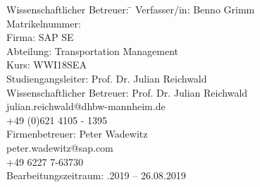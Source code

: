 \begin{titlepage}
\begin{center}
\begin{minipage}{\textwidth}
\begin{tabbing}
	Wissenschaftlicher Betreuer: \hspace{0.85cm}\=\kill
	Verfasser/in: \> Benno Grimm \\[1.5mm]
	Matrikelnummer:  \\[1.5mm]
	Firma: \> SAP SE  \\[1.5mm]
	Abteilung: \> Transportation Management \\[1.5mm]
	Kurs: \> WWI18SEA \\[1.5mm]
	Studiengangsleiter: \> Prof. Dr. Julian Reichwald  \\[1.5mm]
	Wissenschaftlicher Betreuer: \> Prof. Dr. Julian Reichwald \\
	\> julian.reichwald@dhbw-mannheim.de \\
	\> +49 (0)621 4105 - 1395 \\[1.5mm]
	Firmenbetreuer: \> Peter Wadewitz \\
	\> peter.wadewitz@sap.com \\
	\> +49 6227 7-63730 \\[1.5mm]
	Bearbeitungszeitraum: .2019 -- 26.08.2019
\end{tabbing}
\end{minipage}

\end{center}

\end{titlepage}